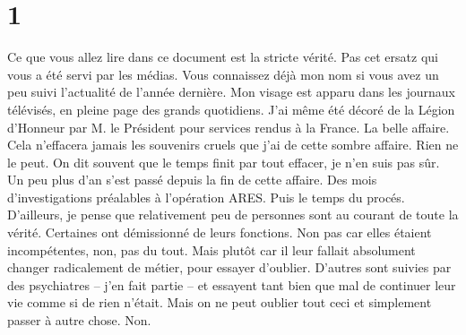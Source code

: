 \chapter{1}
\begin{epigraphs}
\end{epigraphs}

Ce que vous allez lire dans ce document est la stricte vérité. Pas cet ersatz
qui vous a été servi par les médias. Vous connaissez déjà mon nom si vous avez
un peu suivi l’actualité de l’année dernière. Mon visage est apparu dans les
journaux télévisés, en pleine page des grands quotidiens. J’ai même été décoré
de la Légion d’Honneur par M. le Président pour services rendus à la France. La
belle affaire. Cela n'effacera jamais les souvenirs cruels que j'ai de cette
sombre affaire. Rien ne le peut. On dit souvent que le temps finit par tout 
effacer, je n'en suis pas sûr. Un peu plus d'an s'est passé depuis la fin de
cette affaire. Des mois d'investigations préalables à l'opération ARES. Puis le 
temps du procés. D’ailleurs, je pense que relativement peu de personnes sont au
courant de toute la vérité. Certaines ont démissionné de leurs fonctions. Non 
pas car elles étaient incompétentes, non, pas du tout. Mais plutôt car il leur 
fallait absolument changer radicalement de métier, pour essayer d'oublier. 
D'autres sont suivies par des psychiatres – j'en fait partie – et essayent tant 
bien que mal de continuer leur vie comme si de rien n'était. Mais on ne peut 
oublier tout ceci et simplement passer à autre chose. Non. 

